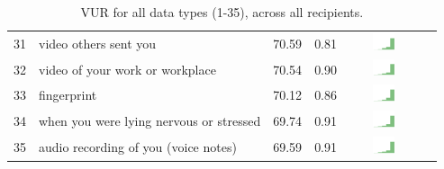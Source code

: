 \begin{table}[t]
\begin{center}
\begin{tabular}{| r | l | r | r | r | r |}
31 & video others sent you & 70.59 & 0.81 & \includegraphics[width = 2cm, height = 0.5cm]{tex-inputs/table-images/sharedvideosotherssentyousavedonyourdevicecombined} \\ 
32 & video of your work or workplace & 70.54 & 0.90 & \includegraphics[width = 2cm, height = 0.5cm]{tex-inputs/table-images/tookvideosatwork(withanoutward-facingcamera)combined} \\ 
33 & fingerprint & 70.12 & 0.86 & \includegraphics[width = 2cm, height = 0.5cm]{tex-inputs/table-images/learnedyourfingerprintsomehowcombined} \\ 
34 & when you were lying nervous or stressed & 69.74 & 0.91 & \includegraphics[width = 2cm, height = 0.5cm]{tex-inputs/table-images/learnedwhenyouwerelyingnervousorstressedcombined} \\ 
35 & audio recording of you (voice notes) & 69.59 & 0.91 & \includegraphics[width = 2cm, height = 0.5cm]{tex-inputs/table-images/recordedyoutalkingtoyourself(makingvoicenotes)combined} \\ 
\hline
\end{tabular}
\caption{VUR for all data types (1-35), across all recipients.}
\label{full-vur-table}
\end{center}
\end{table}

